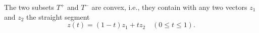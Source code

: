 The two subsets $T^+$ and $T^-$ are convex, i.e., they contain with any two vectors $z_1$ and $z_2$ the straight segment
$$z(t) = (1 - t)z_1 + t z_2 \quad (0 \leq t \leq 1).$$
